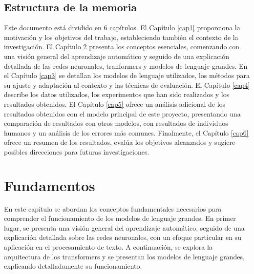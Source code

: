\documentclass[11pt,spanish,listoffigures,listoftables]{tfgetsinf}
\begin{document}
\section{Estructura de la memoria}

Este documento está dividido en 6 capítulos. El Capítulo \ref{cap1} proporciona la motivación y los objetivos del trabajo, estableciendo también el contexto de la investigación. El Capítulo \ref{cap2} presenta los conceptos esenciales, comenzando con una visión general del aprendizaje automático y seguido de una explicación detallada de las redes neuronales, tranformers y modelos de lenguaje grandes. En el Capítulo \ref{cap3} se detallan los modelos de lenguaje utilizados, los métodos para su ajuste y adaptación al contexto y las técnicas de evaluación. El Capítulo \ref{cap4} describe los datos utilizados, los experimentos que han sido realizados y los resultados obtenidos. El Capítulo \ref{cap5} ofrece un análisis adicional de los resultados obtenidos con el modelo principal de este proyecto, presentando una comparación de resultados con otros modelos, con resultados de individuos humanos y un análisis de los errores más comunes. Finalmente, el Capítulo \ref{cap6} ofrece un resumen de los resultados, evalúa los objetivos alcanzados y sugiere posibles direcciones para futuras investigaciones.




\chapter{Fundamentos}\label{cap2}

En este capítulo se abordan los conceptos fundamentales necesarios para comprender el funcionamiento de los modelos de lenguaje grandes. En primer lugar, se presenta una visión general del aprendizaje automático, seguido de una explicación detallada sobre las redes neuronales, con un efoque particular en su aplicación en el procesamiento de texto. A continuación, se explora la arquitectura de los transformers y se presentan los modelos de lenguaje grandes, explicando detalladamente su funcionamiento.
\end{document}
